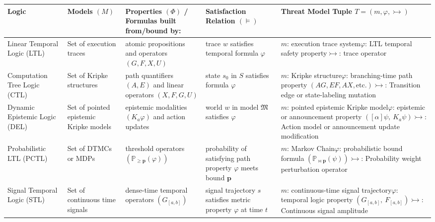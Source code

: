 \documentclass[11pt]{amsart}
\theoremstyle{definition}
\theoremstyle{remark}
\newcommand{\adv}{\rightarrowtail}   %
\begin{document}
\begingroup
\small
\renewcommand{\arraystretch}{1.3}
\begin{longtable}{L{2.2cm} L{2.4cm} L{3.3cm} L{2.8cm} L{4.0cm}}
\toprule
\textbf{Logic} & \textbf{Models} $(M)$ & \textbf{Properties} $(\Phi)$ / Formulas built from/bound by: & \textbf{Satisfaction Relation} $(\models)$ & \textbf{Threat Model Tuple} $T = (m, \varphi, \adv)$ \\
\midrule
\endhead
Linear Temporal Logic (LTL) & Set of execution traces & atomic propositions and operators $(G, F, X, U)$ & trace $w$ satisfies temporal formula $\varphi$ &
$m$: execution trace system\newline $\varphi$: LTL temporal safety property\newline $\adv$: trace operator \\
\addlinespace
Computation Tree Logic (CTL) & Set of Kripke structures & path quantifiers $(A, E)$ and linear operators $(X, F, G, U)$ & state $s_0$ in $S$ satisfies formula $\varphi$ &
$m$: Kripke structure\newline $\varphi$: branching-time path property $(AG, EF, AX, \text{etc.})$\newline $\adv$: Transition edge or state-labeling mutation \\
\addlinespace
Dynamic Epistemic Logic (DEL) & Set of pointed epistemic Kripke models & epistemic modalities $(K_a \varphi)$ and action updates & world $w$ in model $\mathfrak{M}$ satisfies $\varphi$ &
$m$: pointed epistemic Kripke model\newline $\varphi$: epistemic or announcement property $([\alpha]\psi,\ K_a \psi)$\newline $\adv$: Action model or announcement update modification \\
\addlinespace
Probabilistic LTL (PCTL) & Set of DTMCs or MDPs & threshold operators $(\mathbb{P}_{\geq \mathbf{p}}(\varphi))$ & probability of satisfying path property $\varphi$ meets bound $\mathbf{p}$ &
$m$: Markov Chain\newline $\varphi$: probabilistic bound formula $(\mathbb{P}_{\bowtie \mathbf{p}}(\psi))$\newline $\adv$: Probability weight perturbation operator \\
\addlinespace
Signal Temporal Logic (STL) & Set of continuous time signals & dense-time temporal operators $(G_{[a,b]})$ & signal trajectory $s$ satisfies metric property $\varphi$ at time $t$ &
$m$: continuous-time signal trajectory\newline $\varphi$: temporal logic property $(G_{[a,b]},\ F_{[a,b]})$\newline $\adv$: Continuous signal amplitude \\

\end{longtable}
\end{document}
